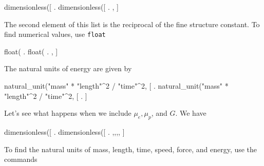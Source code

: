 \beginmaximasession
dimensionless([%
\maximatexsession
{}.  dimensionless([%
.  \left[ \frac{m_e}{m_p},\linebreak[0], \right] \\
\endmaximasession

\noindent The second element of this list is the reciprocal of the fine 
structure constant. To find numerical values, use {\tt float}

\beginmaximasession
float(%
\maximatexsession
{}.  float(%
.  \left[ 5.446169970987487 \times 10^{-4},\linebreak[0]137.03599074450503, \right] \\
\endmaximasession

The natural units of energy are given by

\beginmaximasession
natural_unit("mass" * "length"^2 / "time"^2, [%
\maximatexsession
{}.  natural_unit("mass" * "length"^2 / "time"^2, [%
.  \left[ c^{2}\*m_e,\linebreak[0] \right] \\
\endmaximasession

\noindent Let's see what happens when we include $\mu_e, \mu_p$, and  $G$.  We have

\beginmaximasession
dimensionless([%
\maximatexsession
{}.  dimensionless([%
.  \left[ \frac{\mu_p}{\mu_e},\linebreak[0],\linebreak[0],\linebreak[0],\linebreak[0], \right] \\
\endmaximasession

To find the natural units of mass, length, time,
speed, force, and energy, use  the commands


